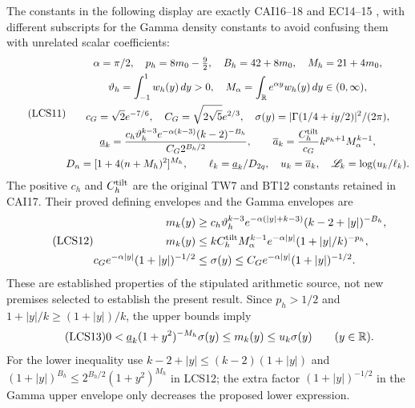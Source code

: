 The constants in the following display are exactly CAI16--18 and
EC14--15 \cite{a04lcs:cai,a04lcs:ec}, with different subscripts for the Gamma
density constants to avoid confusing them with unrelated scalar
coefficients:
\begin{equation}\tag{LCS11}
\begin{gathered}
 \alpha=\pi/2,\quad p_h=8m_0-\tfrac92,\quad B_h=42+8m_0,
 \quad M_h=21+4m_0,\\
 \vartheta_h=\int_{-1}^1w_h(y)\,dy>0,\quad
 M_\alpha=\int_\mathbb R e^{\alpha y}w_h(y)\,dy\in(0,\infty),\\
 c_G=\sqrt2e^{-7/6},\quad C_G=\sqrt{2\sqrt5}e^{2/3},\quad
 \sigma(y)=|\Gamma(1/4+iy/2)|^2/(2\pi),\\
 \underline a_k=
 \frac{c_h\vartheta_h^{k-3}e^{-\alpha(k-3)}(k-2)^{-B_h}}
      {C_G2^{B_h/2}},\qquad
 \overline a_k=\frac{C_h^{\rm tilt}}{c_G}
       k^{p_h+1}M_\alpha^{k-1},\\
 D_n=[1+4(n+M_h)^2]^{M_h},\qquad
 \ell_k=\underline a_k/D_{2q},\quad
 u_k=\overline a_k,\quad \mathscr L_k=\log(u_k/\ell_k).
\end{gathered}
\end{equation}
The positive $c_h$ and $C_h^{\rm tilt}$ are the original TW7 and
BT12 constants retained in CAI17. Their proved defining envelopes
and the Gamma envelopes are
\begin{equation}\tag{LCS12}
\begin{aligned}
 m_k(y)&\ge c_h\vartheta_h^{k-3}
       e^{-\alpha(|y|+k-3)}(k-2+|y|)^{-B_h},\\
 m_k(y)&\le kC_h^{\rm tilt}M_\alpha^{k-1}
       e^{-\alpha|y|}(1+|y|/k)^{-p_h},\\
 c_Ge^{-\alpha|y|}(1+|y|)^{-1/2}
       &\le\sigma(y)\le C_Ge^{-\alpha|y|}(1+|y|)^{-1/2}.
\end{aligned}
\end{equation}
These are established properties of the stipulated arithmetic
source, not new premises selected to establish the present result.
Since $p_h>1/2$ and $1+|y|/k\ge(1+|y|)/k$, the upper bounds imply
\begin{equation}\tag{LCS13}
 0<\underline a_k(1+y^2)^{-M_h}\sigma(y)
       \le m_k(y)\le u_k\sigma(y)\qquad(y\in\mathbb R).
\end{equation}
For the lower inequality use
$k-2+|y|\le(k-2)(1+|y|)$ and
$(1+|y|)^{B_h}\le2^{B_h/2}(1+y^2)^{M_h}$ in LCS12;
the extra factor $(1+|y|)^{-1/2}$ in the Gamma upper envelope
only decreases the proposed lower expression.

